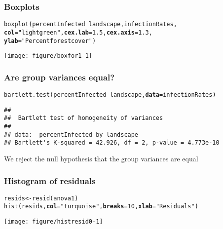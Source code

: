 \documentclass[color=usenames,dvipsnames]{beamer}\usepackage[]{graphicx}\usepackage[]{color}
\makeatletter
\newcommand{\hlnum}[1]{\textcolor[rgb]{0.69,0.494,0}{#1}}%
\newcommand{\hlstr}[1]{\textcolor[rgb]{0.749,0.012,0.012}{#1}}%
\newcommand{\hlopt}[1]{\textcolor[rgb]{0,0,0}{#1}}%
\newcommand{\hlstd}[1]{\textcolor[rgb]{0,0,0}{#1}}%
\newcommand{\hlkwb}[1]{\textcolor[rgb]{0,0.341,0.682}{#1}}%
\newcommand{\hlkwc}[1]{\textcolor[rgb]{0,0,0}{\textbf{#1}}}%
\newcommand{\hlkwd}[1]{\textcolor[rgb]{0.004,0.004,0.506}{#1}}%
\newenvironment{kframe}{%
 \def\at@end@of@kframe{}%
 \ifinner\ifhmode%
  \def\at@end@of@kframe{\end{minipage}}%
  \begin{minipage}{\columnwidth}%
 \fi\fi%
 \def\FrameCommand##1{\hskip\@totalleftmargin \hskip-\fboxsep
 \colorbox{shadecolor}{##1}\hskip-\fboxsep
     \hskip-\linewidth \hskip-\@totalleftmargin \hskip\columnwidth}%
 \MakeFramed {\advance\hsize-\width
   \@totalleftmargin\z@ \linewidth\hsize
   \@setminipage}}%
 {\par\unskip\endMakeFramed%
 \at@end@of@kframe}
\newenvironment{knitrout}{}{} %
\makeatother
\begin{document}
\begin{frame}[fragile]
  \frametitle{Boxplots}
\begin{knitrout}\small
{}\color{fgcolor}\begin{kframe}
\begin{alltt}
\hlkwd{boxplot}\hlstd{(percentInfected}\hlopt{~}\hlstd{landscape, infectionRates,}
        \hlkwc{col}\hlstd{=}\hlstr{"lightgreen"}\hlstd{,} \hlkwc{cex.lab}\hlstd{=}\hlnum{1.5}\hlstd{,} \hlkwc{cex.axis}\hlstd{=}\hlnum{1.3}\hlstd{,}
        \hlkwc{ylab}\hlstd{=}\hlstr{"Percent forest cover"}\hlstd{)}
\end{alltt}
\end{kframe}
\end{knitrout}
\vspace{-0.5cm}
\centering
\texttt{[image: figure/boxfor1-1]} \\
\end{frame}



\begin{frame}[fragile]
  \frametitle{Are group variances equal?}
  \small
\begin{knitrout}\small
{}\color{fgcolor}\begin{kframe}
\begin{alltt}
\hlkwd{bartlett.test}\hlstd{(percentInfected}\hlopt{~}\hlstd{landscape,} \hlkwc{data}\hlstd{=infectionRates)}
\end{alltt}
\begin{verbatim}
## 
## 	Bartlett test of homogeneity of variances
## 
## data:  percentInfected by landscape
## Bartlett's K-squared = 42.926, df = 2, p-value = 4.773e-10
\end{verbatim}
\end{kframe}
\end{knitrout}
\vfill
{We reject the null hypothesis that the group variances are equal}
\end{frame}






\begin{frame}[fragile]
  \frametitle{Histogram of residuals}
\scriptsize
\begin{knitrout}
\color{fgcolor}\begin{kframe}
\begin{alltt}
\hlstd{resids} \hlkwb{<-} \hlkwd{resid}\hlstd{(anova1)}
\hlkwd{hist}\hlstd{(resids,} \hlkwc{col}\hlstd{=}\hlstr{"turquoise"}\hlstd{,} \hlkwc{breaks}\hlstd{=}\hlnum{10}\hlstd{,} \hlkwc{xlab}\hlstd{=}\hlstr{"Residuals"}\hlstd{)}
\end{alltt}
\end{kframe}
\end{knitrout}
\centering
\texttt{[image: figure/histresid0-1]} \\
\end{frame}
\end{document}

